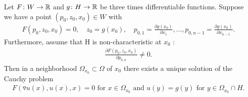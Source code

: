 \begin{theorem}
  Let $F \colon  W \to \mathbb{R}  $ and $g \colon  H \to \mathbb{R} $ be three times differentiable functions.
  Suppose we have a point $(p_0,z_0,x_0) \in  W$ with 
  \begin{align*}
    F(p_0,z_0,x_0) = 0 , \quad z_0=g(x_0) , \quad p_{0,1} = \frac{\partial g(x_0)}{\partial x_1},\ldots ,p_{0,n-1} = \frac{\partial g(x_0)}{\partial x_{n-1}} 
  .\end{align*}
 Furthermore, assume that H is non-characteristic at $x_0$  :
 \begin{align*}
   \frac{\partial F(p_0,z_0,x_0)}{\partial p_{0,n}}  \neq 0
 .\end{align*}
 Then in a neighborhood $\Omega_{x_0} \subset  \Omega $ of $x_0$ there exists a unique solution of the Cauchy problem 
 \begin{align*}
   F(\triangledown u(x),u(x),x) = 0 \text{  for  } x \in \Omega_{x_0} \text{  and  } u(y) = g(y) \text{  for  } y \in \Omega_{x_0} \cap H
 .\end{align*}
\end{theorem}
